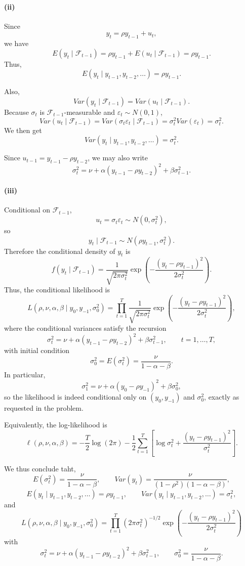 \documentclass[11pt]{article}
\begin{document}
\paragraph{(ii)}

Since
\[
y_t=\rho y_{t-1}+u_t,
\]
we have
\[
E(y_t\mid \mathcal F_{t-1})
=\rho y_{t-1}+E(u_t\mid \mathcal F_{t-1})
=\rho y_{t-1}.
\]
Thus,
\[
{E(y_t\mid y_{t-1},y_{t-2},\dots)=\rho y_{t-1}.}
\]

Also,
\[
Var(y_t\mid \mathcal F_{t-1})
=Var(u_t\mid \mathcal F_{t-1}).
\]
Because $\sigma_t$ is $\mathcal F_{t-1}$-measurable and $\varepsilon_t\sim N(0,1)$,
\[
Var(u_t\mid \mathcal F_{t-1})
=Var(\sigma_t\varepsilon_t\mid \mathcal F_{t-1})
=\sigma_t^2 Var(\varepsilon_t)
=\sigma_t^2.
\]
We then get
\[
{Var(y_t\mid y_{t-1},y_{t-2},\dots)=\sigma_t^2.}
\]

Since $u_{t-1}=y_{t-1}-\rho y_{t-2}$, we may also write
\[
{\sigma_t^2=\nu+\alpha (y_{t-1}-\rho y_{t-2})^2+\beta \sigma_{t-1}^2.}
\]

\paragraph{(iii)}

Conditional on $\mathcal F_{t-1}$,
\[
u_t=\sigma_t\varepsilon_t \sim N(0,\sigma_t^2),
\]
so
\[
y_t\mid \mathcal F_{t-1}\sim N(\rho y_{t-1},\sigma_t^2).
\]
Therefore the conditional density of $y_t$ is
\[
f(y_t\mid \mathcal F_{t-1})
=\frac{1}{\sqrt{2\pi \sigma_t^2}}
\exp\!\left(
-\frac{(y_t-\rho y_{t-1})^2}{2\sigma_t^2}
\right).
\]
Thus, the conditional likelihood is
\[
L(\rho,\nu,\alpha,\beta\mid y_0,y_{-1},\sigma_0^2)
=\prod_{t=1}^T
\frac{1}{\sqrt{2\pi \sigma_t^2}}
\exp\!\left(
-\frac{(y_t-\rho y_{t-1})^2}{2\sigma_t^2}
\right),
\]
where the conditional variances satisfy the recursion
\[
\sigma_t^2=\nu+\alpha (y_{t-1}-\rho y_{t-2})^2+\beta \sigma_{t-1}^2,
\qquad t=1,\dots,T,
\]
with initial condition
\[
{\sigma_0^2=E(\sigma_t^2)=\frac{\nu}{1-\alpha-\beta}.}
\]
In particular,
\[
\sigma_1^2=\nu+\alpha (y_0-\rho y_{-1})^2+\beta \sigma_0^2,
\]
so the likelihood is indeed conditional only on $(y_0,y_{-1})$ and $\sigma_0^2$, exactly as requested in the problem.

Equivalently, the log-likelihood is
\[
\ell(\rho,\nu,\alpha,\beta)
=
-\frac{T}{2}\log(2\pi)
-\frac12\sum_{t=1}^T
\left[
\log \sigma_t^2+\frac{(y_t-\rho y_{t-1})^2}{\sigma_t^2}
\right].
\]

We thus conclude taht,
\[
{E(\sigma_t^2)=\frac{\nu}{1-\alpha-\beta}},\qquad
{Var(y_t)=\frac{\nu}{(1-\rho^2)(1-\alpha-\beta)}},
\]
\[
{E(y_t\mid y_{t-1},y_{t-2},\dots)=\rho y_{t-1}},\qquad
{Var(y_t\mid y_{t-1},y_{t-2},\dots)=\sigma_t^2},
\]
and
\[
{
L(\rho,\nu,\alpha,\beta\mid y_0,y_{-1},\sigma_0^2)
=\prod_{t=1}^T
(2\pi \sigma_t^2)^{-1/2}
\exp\!\left(
-\frac{(y_t-\rho y_{t-1})^2}{2\sigma_t^2}
\right)
}
\]
with
\[
{
\sigma_t^2=\nu+\alpha (y_{t-1}-\rho y_{t-2})^2+\beta \sigma_{t-1}^2,
\qquad
\sigma_0^2=\frac{\nu}{1-\alpha-\beta}.
}
\]
\end{document}
